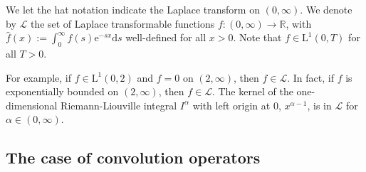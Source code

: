 \documentclass[12pt,reqno]{amsart}
\theoremstyle{plain}
\numberwithin{equation}{section} %
\begin{document}
We let the hat notation indicate the Laplace transform on $(0,\infty)$. We denote by $\mathcal{L}$ the set of Laplace transformable functions $f:(0,\infty)\rightarrow\mathbb{R}$, with $\widehat{f}(x):=\int_0^\infty f(s)\mathrm{e}^{-sx}\mathrm{d}s$ well-defined for all $x>0$. Note that $f\in\mathrm{L}^1(0,T)$ for all $T>0$.

For example, if $f\in\mathrm{L}^1(0,2)$ and $f=0$ on $(2,\infty)$, then $f\in\mathcal{L}$. In fact, if $f$ is exponentially bounded on $(2,\infty)$, then $f\in\mathcal{L}$. The kernel of the one-dimensional Riemann-Liouville integral $I^\alpha$ with left origin at $0$, $x^{\alpha-1}$, is in $\mathcal{L}$ for $\alpha\in (0,\infty)$.

\subsection{The case of convolution operators}
\end{document}
